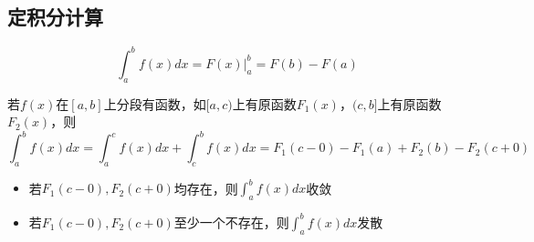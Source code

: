 \subsection{定积分计算}
\[\int_a^bf(x)dx = F(x)\bigg|_a^b = F(b) - F(a)\]

若\(f(x)\)在\([a, b]\)上分段有函数，如\([a, c)\)上有原函数\(F_1(x)\)，\((c, b]\)上有原函数\(F_2(x)\)，则\[\int_a^bf(x)dx = \int_a^cf(x)dx + \int_c^bf(x)dx = F_1(c - 0) - F_1(a) + F_2(b) - F_2(c + 0)\]
\begin{itemize}
    \item 若\(F_1(c - 0), F_2(c + 0)\)均存在，则\(\displaystyle\int_a^bf(x)dx\)收敛
    \item 若\(F_1(c - 0), F_2(c + 0)\)至少一个不存在，则\(\displaystyle\int_a^bf(x)dx\)发散
\end{itemize}

